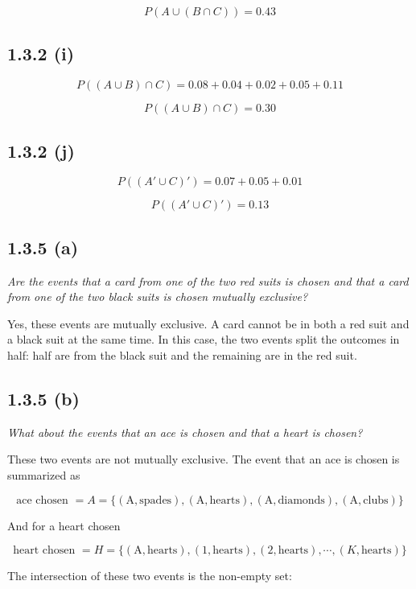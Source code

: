 \documentclass{article}
\begin{document}
\[
\boxed{P(A\cup (B\cap C)) = 0.43}
\]

\subsection*{1.3.2 (i)}

\[
P((A\cup B)\cap C) = 0.08 + 0.04 + 0.02 + 0.05 + 0.11
\]

\[
\boxed{P((A\cup B)\cap C) = 0.30}
\]

\subsection*{1.3.2 (j)}

\[
P((A'\cup C)') = 0.07 + 0.05 + 0.01
\]

\[
\boxed{P((A'\cup C)') = 0.13}
\]

\subsection*{1.3.5 (a)}

\textit{Are the events that a card from one of the two red suits is chosen and that a card from one of the two black suits is chosen mutually exclusive?}

Yes, these events are mutually exclusive. A card cannot be in both a
red suit and a black suit at the same time. In this case, the two
events split the outcomes in half: half are from the black suit and
the remaining are in the red suit.

\subsection*{1.3.5 (b)}

\textit{What about the events that an ace is chosen and that a heart is chosen?}

These two events are not mutually exclusive. The event that an ace is
chosen is summarized as

\[
\text{ace chosen } = A = \{
\left(\text{A}, \text{spades}\right),
\left(\text{A}, \text{hearts}\right),
\left(\text{A}, \text{diamonds}\right),
\left(\text{A}, \text{clubs}\right)
\}
\]

And for a heart chosen

\[
\text{heart chosen } = H = \{
\left(\text{A}, \text{hearts}\right),
\left(1, \text{hearts}\right),
\left(2, \text{hearts}\right),
\cdots,
\left(K, \text{hearts}\right)
\}
\]

The intersection of these two events is the non-empty set:
\end{document}
